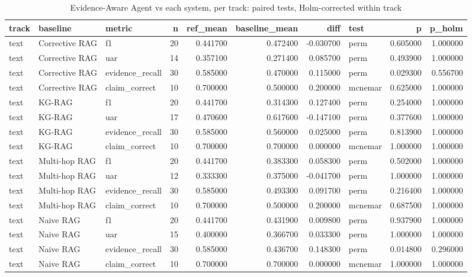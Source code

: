\begin{table}
\caption{Evidence-Aware Agent vs each system, per track: paired tests, Holm-corrected within track}
\label{tab:table_significance}
\begin{tabular}{lllrrrrlrr}
\toprule
track & baseline & metric & n & ref\_mean & baseline\_mean & diff & test & p & p\_holm \\
\midrule
text & Corrective RAG & f1 & 20 & 0.441700 & 0.472400 & -0.030700 & perm & 0.605000 & 1.000000 \\
text & Corrective RAG & uar & 14 & 0.357100 & 0.271400 & 0.085700 & perm & 0.493900 & 1.000000 \\
text & Corrective RAG & evidence\_recall & 30 & 0.585000 & 0.470000 & 0.115000 & perm & 0.029300 & 0.556700 \\
text & Corrective RAG & claim\_correct & 10 & 0.700000 & 0.500000 & 0.200000 & mcnemar & 0.625000 & 1.000000 \\
text & KG-RAG & f1 & 20 & 0.441700 & 0.314300 & 0.127400 & perm & 0.254000 & 1.000000 \\
text & KG-RAG & uar & 17 & 0.470600 & 0.617600 & -0.147100 & perm & 0.377600 & 1.000000 \\
text & KG-RAG & evidence\_recall & 30 & 0.585000 & 0.560000 & 0.025000 & perm & 0.813900 & 1.000000 \\
text & KG-RAG & claim\_correct & 10 & 0.700000 & 0.700000 & 0.000000 & mcnemar & 1.000000 & 1.000000 \\
text & Multi-hop RAG & f1 & 20 & 0.441700 & 0.383300 & 0.058300 & perm & 0.502000 & 1.000000 \\
text & Multi-hop RAG & uar & 12 & 0.333300 & 0.375000 & -0.041700 & perm & 1.000000 & 1.000000 \\
text & Multi-hop RAG & evidence\_recall & 30 & 0.585000 & 0.493300 & 0.091700 & perm & 0.216400 & 1.000000 \\
text & Multi-hop RAG & claim\_correct & 10 & 0.700000 & 0.500000 & 0.200000 & mcnemar & 0.687500 & 1.000000 \\
text & Naive RAG & f1 & 20 & 0.441700 & 0.431900 & 0.009800 & perm & 0.937900 & 1.000000 \\
text & Naive RAG & uar & 15 & 0.400000 & 0.366700 & 0.033300 & perm & 1.000000 & 1.000000 \\
text & Naive RAG & evidence\_recall & 30 & 0.585000 & 0.436700 & 0.148300 & perm & 0.014800 & 0.296000 \\
text & Naive RAG & claim\_correct & 10 & 0.700000 & 0.700000 & 0.000000 & mcnemar & 1.000000 & 1.000000 \\

\end{tabular}
\end{table}
